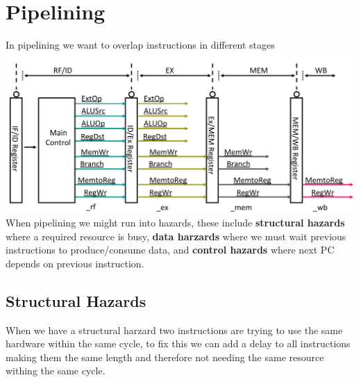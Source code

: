 \section{Pipelining}
In pipelining we want to overlap instructions in different stages
\includegraphics[width=\linewidth]{png/pipe.png}
When pipelining we might run into hazards, these include \textbf{structural hazards}
where a required resource is busy, \textbf{data harzards} where we must wait previous
instructions to produce/consume data, and \textbf{control hazards} where next PC
depends on previous instruction. \\
\subsection*{Structural Hazards}
When we have a structural harzard two instructions are trying to use the same hardware
within the same cycle, to fix this we can add a delay to all instructions making
them the same length and therefore not needing the same resource withing the
same cycle.\\
